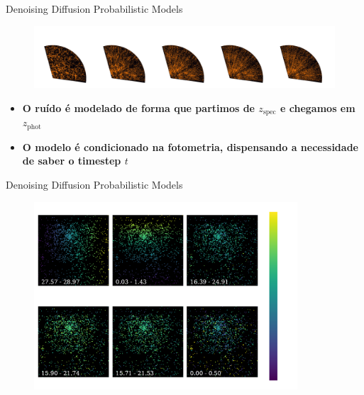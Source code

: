 \begin{frame}[c]{Denoising Diffusion Probabilistic Models}
    \begin{figure}
        \centering
        \includegraphics[width=\linewidth]{script/images/lss_illustration.pdf}
    \end{figure}
    \begin{splusbox}{}
        \begin{itemize}
            \item \textbf{O ruído é modelado de forma que partimos de $z_\text{spec}$ e chegamos em $z_\text{phot}$}
            \item \textbf{O modelo é condicionado na fotometria, dispensando a necessidade de saber o timestep $t$}
        \end{itemize}
    \end{splusbox}
\end{frame}

\begin{frame}[c]{Denoising Diffusion Probabilistic Models}
    \begin{figure}
        \centering
        \includegraphics[height=7cm]{script/images/ddpm_diffusion_features.pdf}
    \end{figure}
\end{frame}

